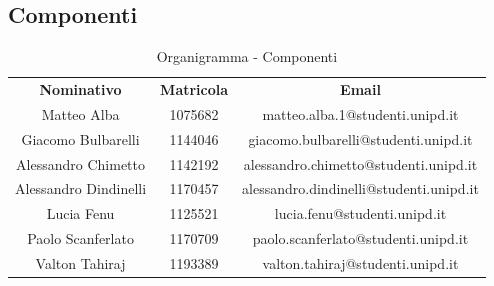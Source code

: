 \newpage

\subsection{Componenti}
	\begin{table} [h!]
		\begin{center}
			\renewcommand{\arraystretch}{3}
			\begin{tabular} { c c c }
				\rowcolor{lightgray}
				\textbf{Nominativo} & \textbf{Matricola} & \textbf{Email} \\
				Matteo Alba & 1075682 & matteo.alba.1@studenti.unipd.it\\
				Giacomo Bulbarelli & 1144046 & giacomo.bulbarelli@studenti.unipd.it\\
				Alessandro Chimetto & 1142192 & alessandro.chimetto@studenti.unipd.it\\
				Alessandro Dindinelli & 1170457 & alessandro.dindinelli@studenti.unipd.it\\
				Lucia Fenu & 1125521 & lucia.fenu@studenti.unipd.it\\
				Paolo Scanferlato & 1170709 & paolo.scanferlato@studenti.unipd.it\\
				Valton Tahiraj & 1193389 & valton.tahiraj@studenti.unipd.it\\
			\end{tabular}
			\caption{Organigramma - Componenti}
		\end{center}
	\end{table}
	






